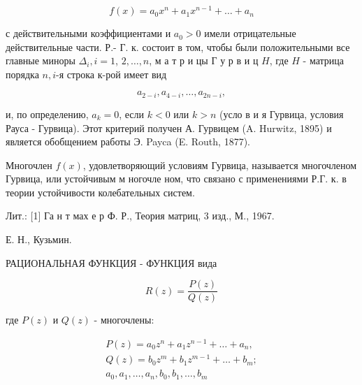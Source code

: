 \documentclass[10pt]{article}
\begin{document}
\[

f(x)=a_{0} x^{n}+a_{1} x^{n-1}+\ldots+a_{n}

\]



с действительными коэффициентами и $a_{0}>0$ имели отрицательные действительные части. Р.- Г. к. состоит в том, чтобы были положительными все главные миноры $\Delta_{i}, i=1$, $2, \ldots, n$, м а т р и цы $Г$ у р в и ц $H$, где $H$ - матрица порядка $n, i$-я строка к-рой имеет вид



\[

a_{2-i}, a_{4-i}, \ldots, a_{2 n-i},

\]



и, по определению, $a_{k}=0$, если $k<0$ или $k>n$ (усло в и я Гурвица, условия Рауса - Гурвица). Этот критерий получен А. Гурвицем (A. Hurwitz, 1895) и является обобщением работы Э. Payca (E. Routh, 1877).



Многочлен $f(x)$, удовлетворяющий условиям Гурвица, называется многочленом Гурвица, или устойчивым м ногочле ном, что связано с применениями Р.Г. к. в теории устойчивости колебательных систем.



Лит.: [1] Га н т мах е р Ф. Р., Теория матриц, 3 изд., М., 1967.



Е. Н., Кузьмин.



РАЦИОНАЛЬНАЯ ФУНКЦИЯ - ФУНКЦИЯ вида



\[

R(z)=\frac{P(z)}{Q(z)}

\]



где $P(z)$ и $Q(z)$ - многочлены:



\[

\begin{gathered}

P(z)=a_{0} z^{n}+a_{1} z^{n-1}+\ldots+a_{n}, \\

Q(z)=b_{0} z^{m}+b_{1} z^{m-1}+\ldots+b_{m} ; \\

a_{0}, a_{1}, \ldots, a_{n}, b_{0}, b_{1}, \ldots, b_{m}

\end{gathered}

\]
\end{document}
